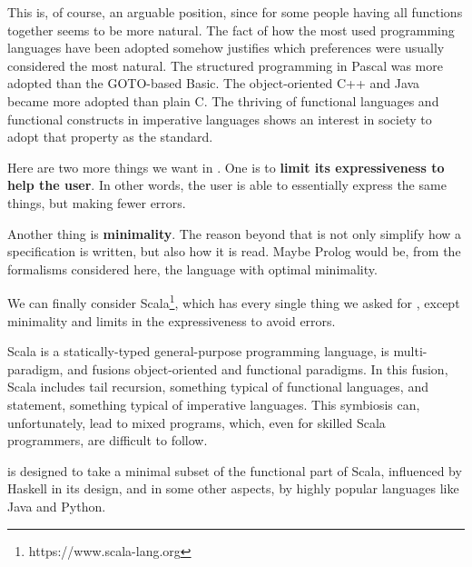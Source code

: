 This is, of course, an arguable position, since for some people having all functions together seems to be more natural.
The fact of how the most used programming languages have been adopted somehow justifies which preferences were usually considered the most natural.
The structured programming in Pascal was more adopted than the GOTO-based Basic.
The object-oriented C++ and Java became more adopted than plain C.
The thriving of functional languages and functional constructs in imperative languages shows an interest in society to adopt that property as the standard.

Here are two more things we want in \Soda.
One is to \textbf{limit its expressiveness to help the user}.
In other words, the user is able to essentially express the same things, but making fewer errors.

Another thing is \textbf{minimality}.
The reason beyond that is not only simplify how a specification is written, but also how it is read.
Maybe Prolog would be, from the formalisms considered here, the language with optimal minimality.

We can finally consider Scala\footnote{https://www.scala-lang.org}, which has every single thing we asked for \Soda, except minimality and limits in the expressiveness to avoid errors.

Scala is a statically-typed general-purpose programming language, is multi-paradigm, and fusions object-oriented and functional paradigms.
In this fusion, Scala includes tail recursion, something typical of functional languages, and \scalawhile statement, something typical of imperative languages.
This symbiosis can, unfortunately, lead to mixed programs, which, even for skilled Scala programmers, are difficult to follow.

\Soda is designed to take a minimal subset of the functional part of Scala, influenced by Haskell in its design, and in some other aspects, by highly popular languages like Java and Python.


